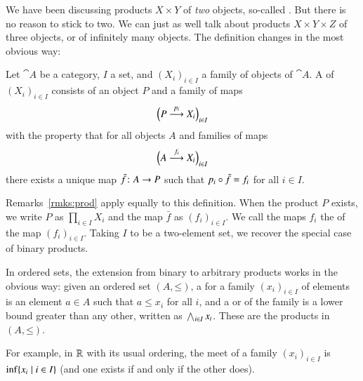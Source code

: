 We have been discussing products $X \times Y$ of \emph{two} objects,
so-called .  But there is no reason to stick to two.  We can just as well
talk about products $X \times Y \times Z$ of three objects, or of
infinitely many objects.  The definition changes in the most obvious way:

\begin{defn}
\label{defn:gen-prod}
Let $\cat{A}$ be a category, $I$ a set, and $(X_i)_{i \in I}$ a family of
objects of $\cat{A}$.  A %
%
%
of $(X_i)_{i \in I}$ consists of an object $P$ and a family of maps
\[
\Bigl(P \stackrel{p_i}{\longrightarrow} X_i\Bigr)_{i \in I}
\]
with the property that for all objects $A$ and families of maps
%
\begin{equation}
\label{eq:gen-prod-cone}
\Bigl(A \stackrel{f_i}{\longrightarrow} X_i\Bigr)_{i \in I}
\end{equation}
%
there exists a unique map $\bar{f}\from A \to P$ such that $p_i \mathbin{\circ} \bar{f} =
f_i$ for all $i \in I$.
\end{defn}

Remarks~\ref{rmks:prod} apply equally to this definition.  When the product
$P$ exists, we write $P$ as $\prod_{i \in I} X_i$%
%
%
and the map $\bar{f}$ as $(f_i)_{i \in I}$.%
%
%
We call the maps $f_i$ the %
%
%
of the map $(f_i)_{i \in I}$.  Taking $I$ to be a two-element set, we
recover the special case of binary products.

\begin{example}
In ordered sets, the extension from binary to arbitrary products works in
the obvious way: given an ordered set $(A, \mathord{\leq})$, a
 for a family $(x_i)_{i \in I}$ of elements is an element $a \in A$
such that $a \leq x_i$ for all $i$, and a  or %
%
%
of the family is a lower bound greater than any other, written as $\bigwedge_{i
\in I} x_i$.%
%
%
These are the products in $(A, \mathord{\leq})$.

For example, in $\mathbb{R}$ with its usual ordering, the meet of a family
$(x_i)_{i \in I}$ is $\inf\{x_i \mathrel{|} i \in I\}$%
%
%
(and one exists if and only if the other does).
\end{example}

